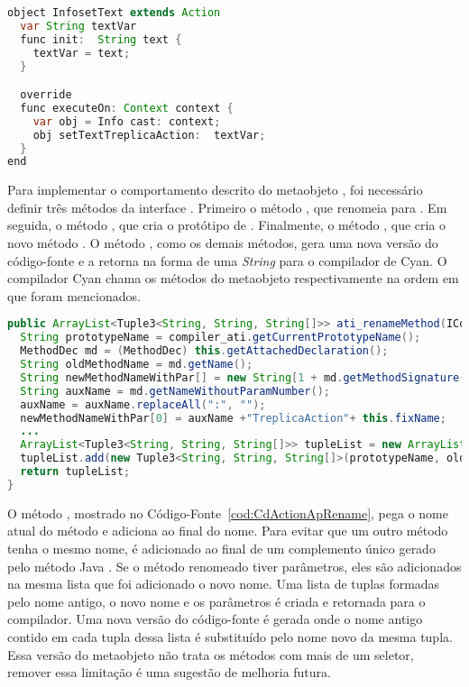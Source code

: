 \begin{lstlisting}[language=Java, caption={Protótipo criado por \textbf{treplicaAction}}, label={cod:TreplicaMetaActionResult}]
object InfosetText extends Action
  var String textVar
  func init:  String text {
    textVar = text;
  }

  override
  func executeOn: Context context {
    var obj = Info cast: context;
    obj setTextTreplicaAction:  textVar;
  }
end
\end{lstlisting}

Para implementar o comportamento descrito do metaobjeto , foi necessário definir três métodos da interface . Primeiro o método , que renomeia  para . Em seguida, o método , que cria o protótipo de . Finalmente, o método , que cria o novo método . O método , como os demais métodos, gera uma nova versão do código-fonte e a retorna na forma de uma \emph{String} para o compilador de Cyan. O compilador Cyan chama os métodos do metaobjeto respectivamente na ordem em que foram mencionados.

\begin{lstlisting}[language=Java, caption={Método que renomeia os métodos anotados com \textbf{treplicaAction}}, label={cod:CdActionApRename}, frame=TLBR]
public ArrayList<Tuple3<String, String, String[]>> ati_renameMethod(ICompiler_ati compiler_ati) {
  String prototypeName = compiler_ati.getCurrentPrototypeName();
  MethodDec md = (MethodDec) this.getAttachedDeclaration();
  String oldMethodName = md.getName();
  String newMethodNameWithPar[] = new String[1 + md.getMethodSignature().getParameterList().size()];
  String auxName = md.getNameWithoutParamNumber();
  auxName = auxName.replaceAll(":", "");
  newMethodNameWithPar[0] = auxName +"TreplicaAction"+ this.fixName;
  ...
  ArrayList<Tuple3<String, String, String[]>> tupleList = new ArrayList<>();
  tupleList.add(new Tuple3<String, String, String[]>(prototypeName, oldMethodName, newMethodNameWithPar));
  return tupleList;
}
\end{lstlisting}

O método , mostrado no Código-Fonte~\ref{cod:CdActionApRename}, pega o nome atual do método e adiciona  ao final do nome. Para evitar que um outro método tenha o mesmo nome, é adicionado ao final de  um complemento único gerado pelo método Java . Se o método renomeado tiver parâmetros, eles são adicionados na mesma lista que foi adicionado o novo nome. Uma lista de tuplas formadas pelo nome antigo, o novo nome e os parâmetros é criada e retornada para o compilador. Uma nova versão do código-fonte é gerada onde o nome antigo contido em cada tupla dessa lista é substituído pelo nome novo da mesma tupla. Essa versão do metaobjeto  não trata os métodos com mais de um seletor, remover essa limitação é uma sugestão de melhoria futura.   

